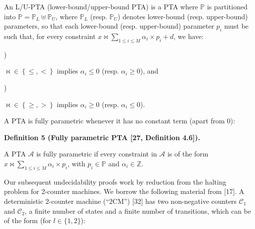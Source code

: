  
An L/U-PTA (lower-bound/upper-bound PTA) is a PTA where $\mathbb{P}$ is partitioned into $\mathbb{P}=\mathbb{P}_{L}\uplus\mathbb{P}_{U}$, where $\mathbb{P}_{L}$ (resp. $\mathbb{P}_{U}$) denotes lower-bound (resp. upper-bound) parameters, so that each lower-bound (resp. upper-bound) parameter $p_{i}$ must be such that, for every constraint $x\bowtie\sum_{1\leq i\leq M}\alpha_{i}\times p_{i}+d$, we have:\par
  
\par{}) 
 
${\bowtie}\in\left\{\leq,<\right\}$ implies $\alpha_{i}\leq 0$ (resp. $\alpha_{i}\geq 0$), and\par
 
 
 
\par{}) 
 
${\bowtie}\in\left\{\geq,>\right\}$ implies $\alpha_{i}\geq 0$ (resp. $\alpha_{i}\leq 0$).\par
 
 
  
 
 
 
A PTA is fully parametric whenever it has no constant term (apart from 0):\par
 
 
 
\par\medskip\noindent\textbf{Definition 5 (Fully parametric PTA [27, Definition 4.6]).}\par
 
 
A PTA $\mathcal{A}$ is fully parametric if every constraint in $\mathcal{A}$ is of the form $x\bowtie\sum_{1\leq i\leq M}\alpha_{i}\times p_{i}$, with $p_{i}\in\mathbb{P}$ and $\alpha_{i}\in\mathbb{Z}$.\par
 
 
 
 
Our subsequent undecidability proofs work by reduction from the halting problem for 2-counter machines. We borrow the following material from [17]. A deterministic 2-counter machine (“2CM”) [32] has two non-negative counters $\mathcal{C}_{1}$ and $\mathcal{C}_{2}$, a finite number of states and a finite number of transitions, which can be of the form (for $l\in\{1,2\}$):\par
  
